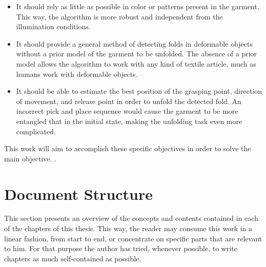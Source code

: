 \begin{itemize}
	\item It should rely as little as possible in color or patterns present in the garment. This way, the algorithm is more robust and independent from the illumination conditions.
	\item It should provide a general method of detecting folds in deformable objects without a prior model of the garment to be unfolded. The absence of a prior model allows the algorithm to work with any kind of textile article, much as humans work with deformable objects.
	\item It should be able to estimate the best position of the grasping point, direction of movement, and release point in order to unfold the detected fold. An incorrect pick and place sequence would cause the garment to be more entangled that in the initial state, making the unfolding task even more complicated.
\end{itemize}


This work will aim to accomplish these specific objectives in order to solve the main objective. .

\section{Document Structure}
\label{intro_structure}

This section presents an overview of the concepts and contents contained in each of the chapters of this thesis. This way, the reader may consume this work in a linear fashion, from start to end, or concentrate on specific parts that are relevant to him. For that purpose the author has tried, whenever possible, to write chapters as much self-contained as possible.


